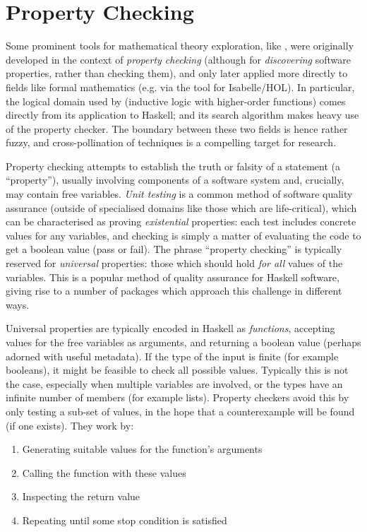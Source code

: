\section{Property Checking}

Some prominent tools for mathematical theory exploration, like \quickspec{},
were originally developed in the context of \emph{property checking} (although
for \emph{discovering} software properties, rather than checking them), and only
later applied more directly to fields like formal mathematics (e.g. via the
\hipster{} tool for Isabelle/HOL). In particular, the logical domain used by
\quickspec{} (inductive logic with higher-order functions) comes directly from
its application to Haskell; and its search algorithm makes heavy use of the
\quickcheck{} property checker. The boundary between these two fields is hence
rather fuzzy, and cross-pollination of techniques is a compelling target for
research.

Property checking attempts to establish the truth or falsity of a statement (a
``property''), usually involving components of a software system and, crucially,
may contain free variables. \emph{Unit testing} is a common method of software
quality assurance (outside of specialised domains like those which are
life-critical), which can be characterised as proving \emph{existential}
properties: each test includes concrete values for any variables, and checking
is simply a matter of evaluating the code to get a boolean value (pass or fail).
The phrase ``property checking'' is typically reserved for \emph{universal}
properties: those which should hold \emph{for all} values of the variables.
This is a popular method of quality assurance for Haskell software, giving rise
to a number of packages which approach this challenge in different ways.

Universal properties are typically encoded in Haskell as \emph{functions},
accepting values for the free variables as arguments, and returning a boolean
value (perhaps adorned with useful metadata). If the type of the input is finite
(for example booleans), it might be feasible to check all possible
values. Typically this is not the case, especially when multiple variables are
involved, or the types have an infinite number of members (for example
lists). Property checkers avoid this by only testing a sub-set of values, in the
hope that a counterexample will be found (if one exists). They work by:

\begin{enumerate}
\item Generating suitable values for the function's arguments
\item Calling the function with these values
\item Inspecting the return value
\item Repeating until some stop condition is satisfied
\end{enumerate}

